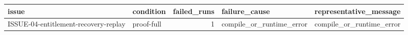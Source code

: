 \begin{tabular}{llrll}
\toprule
issue & condition & failed_runs & failure_cause & representative_message \\
\midrule
ISSUE-04-entitlement-recovery-replay & proof-full & 1 & compile_or_runtime_error & compile_or_runtime_error \\
\bottomrule
\end{tabular}
